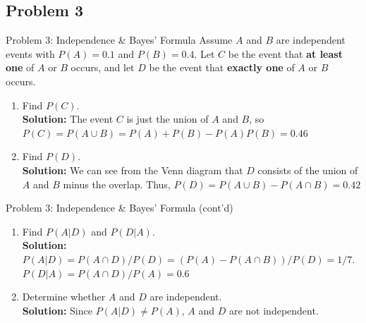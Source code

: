 \documentclass{beamer}
\begin{document}
\subsection{Problem 3}
\begin{frame}{Problem 3: Independence \& Bayes' Formula}
Assume $A$ and $B$ are independent events with $P(A)=0.1$ and $P(B)=0.4$. Let $C$ be the event that \textbf{at least one} of $A$ or $B$ occurs, and let $D$ be the event that \textbf{exactly one} of $A$ or $B$ occurs.
    \vspace{0.3cm}
    \begin{enumerate}[\hspace{0.5cm}1.]
        \item Find $P(C)$.\\
        \textbf{Solution:} The event $C$ is just the union of $A$ and $B$, so $P(C)=P(A\cup B)=P(A)+P(B)-P(A)P(B)=0.46$
        \item Find $P(D)$. \\
        \textbf{Solution:} We can see from the Venn diagram that $D$ consists of the union of $A$ and $B$ minus the overlap. Thus, $P(D)=P(A\cup B)-P(A\cap B)=0.42$
    \end{enumerate}
\end{frame}

\begin{frame}{Problem 3: Independence \& Bayes' Formula (cont'd)}
    \begin{enumerate}[\hspace{0.5cm}3.]
        \item Find $P(A|D)$ and $P(D|A)$.\\
        \textbf{Solution:} $P(A|D)=P(A\cap D)/P(D)=(P(A)-P(A\cap B))/P(D)=1/7$. $P(D|A)=P(A\cap D)/P(A)=0.6$
        \item Determine whether $A$ and $D$ are independent.\\
        \textbf{Solution:} Since $P(A|D)\neq P(A)$, $A$ and $D$ are not independent.
    \end{enumerate}
    \vspace{5cm}
\end{frame}
\end{document}
